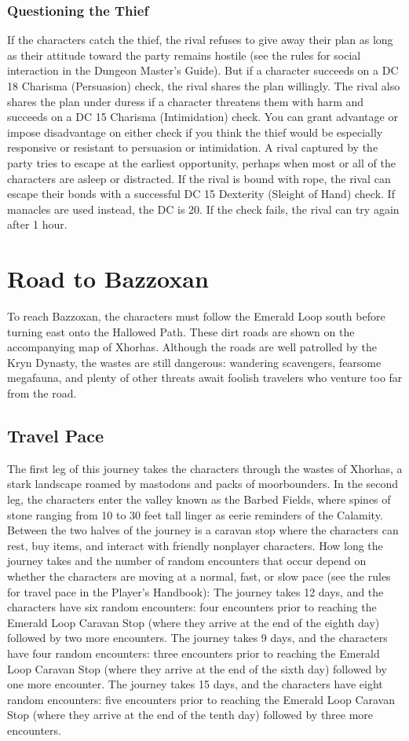 \documentclass[10pt,a4,twoside,twocolumn,openany,nodeprecatedcode]{dndbook}
\begin{document}
\subsubsection{Questioning the Thief}
If the characters catch the thief, the rival refuses to give away their plan as long as their attitude toward the party remains hostile (see the rules for social interaction in the Dungeon Master's Guide). But if a character succeeds on a DC 18 Charisma (Persuasion) check, the rival shares the plan willingly. The rival also shares the plan under duress if a character threatens them with harm and succeeds on a DC 15 Charisma (Intimidation) check. You can grant advantage or impose disadvantage on either check if you think the thief would be especially responsive or resistant to persuasion or intimidation.
A rival captured by the party tries to escape at the earliest opportunity, perhaps when most or all of the characters are asleep or distracted. If the rival is bound with rope, the rival can escape their bonds with a successful DC 15 Dexterity (Sleight of Hand) check. If manacles are used instead, the DC is 20. If the check fails, the rival can try again after 1 hour.
\section{Road to Bazzoxan}
To reach Bazzoxan, the characters must follow the Emerald Loop south before turning east onto the Hallowed Path. These dirt roads are shown on the accompanying map of Xhorhas. Although the roads are well patrolled by the Kryn Dynasty, the wastes are still dangerous: wandering scavengers, fearsome megafauna, and plenty of other threats await foolish travelers who venture too far from the road.
\subsection{Travel Pace}
The first leg of this journey takes the characters through the wastes of Xhorhas, a stark landscape roamed by mastodons and packs of moorbounders. In the second leg, the characters enter the valley known as the Barbed Fields, where spines of stone ranging from 10 to 30 feet tall linger as eerie reminders of the Calamity. Between the two halves of the journey is a caravan stop where the characters can rest, buy items, and interact with friendly nonplayer characters.
How long the journey takes and the number of random encounters that occur depend on whether the characters are moving at a normal, fast, or slow pace (see the rules for travel pace in the Player's Handbook):
{{The journey takes 12 days, and the characters have six random encounters: four encounters prior to reaching the Emerald Loop Caravan Stop (where they arrive at the end of the eighth day) followed by two more encounters.}}
{{The journey takes 9 days, and the characters have four random encounters: three encounters prior to reaching the Emerald Loop Caravan Stop (where they arrive at the end of the sixth day) followed by one more encounter.}}
{{The journey takes 15 days, and the characters have eight random encounters: five encounters prior to reaching the Emerald Loop Caravan Stop (where they arrive at the end of the tenth day) followed by three more encounters.}}
\end{document}

